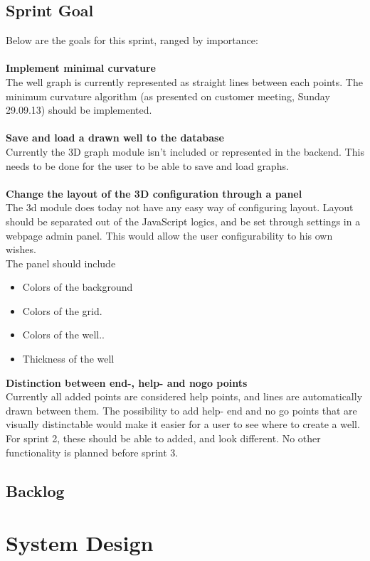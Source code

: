\documentclass{report}
\begin{document}
\subsection{Sprint Goal} \label{subsec:sprint_goal}
Below are the goals for this sprint, ranged by importance:\\\\
\textbf{Implement minimal curvature}\\
The well graph is currently represented as straight lines between each points. The minimum curvature algorithm (as presented on customer meeting, Sunday 29.09.13) should be implemented.\\ \\
\textbf{Save and load a drawn well to the database}\\
Currently the 3D graph module isn’t included or represented in the backend. This needs to be done for the user to be able to save and load graphs.\\ \\
\textbf{Change the layout of the 3D configuration through a panel} \\
The 3d module does today not have any easy way of configuring layout. Layout should be separated out of the JavaScript logics, and be set through settings in a webpage admin panel. This would allow the user configurability to his own wishes. \\ 
The panel should include
\begin{itemize}
\item Colors of the background
\item Colors of the grid.
\item Colors of the well..
\item Thickness of the well
\end{itemize} 
\textbf{Distinction between end-, help- and nogo points}\\
Currently all added points are considered help points, and lines are automatically drawn between them. The possibility to add help- end and no go points that are visually distinctable would make it easier for a user to see where to create a well. For sprint 2, these should be able to added, and look different. No other functionality is planned before sprint 3.

\subsection{Backlog} \label{subsec:backlog} %
\section{System Design} \label{sec:sprint_planning}
\end{document}
